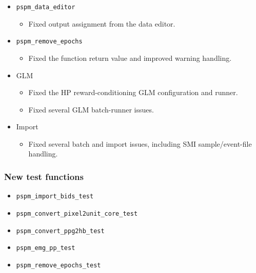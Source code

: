 \documentclass[english]{article}
\numberwithin{equation}{section}
\numberwithin{figure}{section}
\begin{document}
\begin{itemize}
\item \texttt{pspm\_data\_editor}
\begin{itemize}
\item Fixed output assignment from the data editor.
\end{itemize}

\item \texttt{pspm\_remove\_epochs}
\begin{itemize}
\item Fixed the function return value and improved warning handling.
\end{itemize}

\item GLM
\begin{itemize}
\item Fixed the HP reward-conditioning GLM configuration and runner.
\item Fixed several GLM batch-runner issues.
\end{itemize}

\item Import
\begin{itemize}
\item Fixed several batch and import issues, including SMI sample/event-file handling.
\end{itemize}

\end{itemize}

\subsubsection*{New test functions}
\begin{itemize}
\item \texttt{pspm\_import\_bids\_test}
\item \texttt{pspm\_convert\_pixel2unit\_core\_test}
\item \texttt{pspm\_convert\_ppg2hb\_test}
\item \texttt{pspm\_emg\_pp\_test}
\item \texttt{pspm\_remove\_epochs\_test}
\end{itemize}






\end{document}
